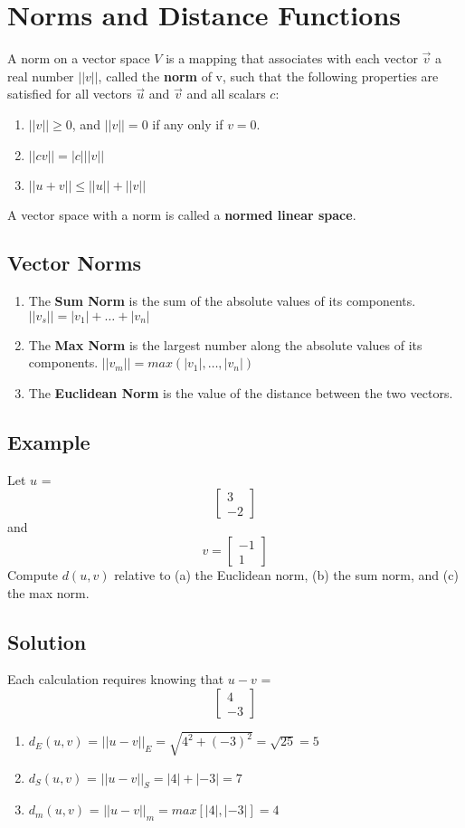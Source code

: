 \section{Norms and Distance Functions}
A norm on a vector space $V$ is a mapping that associates with each vector $\vec{v}$ a real number $||v||$, called the \textbf{norm} of v, 
such that the following properties are satisfied for all vectors $\vec{u}$ and $\vec{v}$ and all scalars $c$:
\begin{enumerate}
    \item $||v|| \geq 0$, and $||v|| = 0$ if any only if $v = 0$.
    \item $||cv|| = |c|||v||$
    \item $||u+v|| \leq ||u|| + ||v||$
\end{enumerate}
A vector space with a norm is called a \textbf{normed linear space}.

\subsection{Vector Norms}
\begin{enumerate}
    \item The \textbf{Sum Norm} is the sum of the absolute values of its components. $||v_s|| = |v_1| + \dots + |v_n|$
    \item The \textbf{Max Norm} is the largest number along the absolute values of its components. $||v_m|| = max(|v_1|, \dots, |v_n|)$
    \item The \textbf{Euclidean Norm} is the value of the distance between the two vectors. 
\end{enumerate}
\subsection*{Example}
Let $u$ = $$\begin{bmatrix}
    3 \\-2
\end{bmatrix}$$ and $$v = \begin{bmatrix}
    -1\\1
\end{bmatrix}$$ Compute $d(u,v)$ relative to (a) the Euclidean norm, (b) the sum norm, and (c) the max norm.
\subsection*{Solution}
Each calculation requires knowing that $u - v$ = $$\begin{bmatrix}
    4\\-3
\end{bmatrix}$$
\begin{enumerate}
    \item $d_E(u,v)$ = $||u-v||_E = \sqrt{4^2 + (-3)^2} = \sqrt{25} = 5$
    \item $d_S(u,v)$ = $||u-v||_S = |4| + |-3| = 7$
    \item $d_m(u,v)$ = $||u-v||_m = max[|4|, |-3|] = 4$
\end{enumerate}

